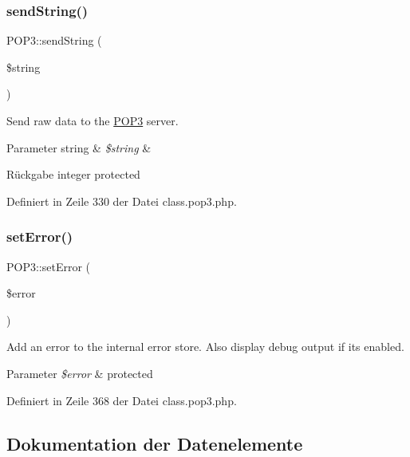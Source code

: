 \subsubsection{\texorpdfstring{send\+String()}{sendString()}}
{\footnotesize\ttfamily P\+O\+P3\+::send\+String (\begin{DoxyParamCaption}\item[{}]{\$string }\end{DoxyParamCaption})\hspace{0.3cm}{\ttfamily [protected]}}

Send raw data to the \mbox{\hyperlink{class_p_o_p3}{P\+O\+P3}} server. 
\begin{DoxyParams}[1]{Parameter}
string & {\em \$string} & \\
\hline
\end{DoxyParams}
\begin{DoxyReturn}{Rückgabe}
integer  protected 
\end{DoxyReturn}


Definiert in Zeile 330 der Datei class.\+pop3.\+php.

\mbox{\label{class_p_o_p3_abf17a9af3cbdf988738dfb894efd0c8a}} 
\subsubsection{\texorpdfstring{set\+Error()}{setError()}}
{\footnotesize\ttfamily P\+O\+P3\+::set\+Error (\begin{DoxyParamCaption}\item[{}]{\$error }\end{DoxyParamCaption})\hspace{0.3cm}{\ttfamily [protected]}}

Add an error to the internal error store. Also display debug output if it\textquotesingle{}s enabled. 
\begin{DoxyParams}{Parameter}
{\em \$error} & protected \\
\hline
\end{DoxyParams}


Definiert in Zeile 368 der Datei class.\+pop3.\+php.



\subsection{Dokumentation der Datenelemente}
\mbox{\label{class_p_o_p3_a5de802c27a18225db6247ced4e3caae9}} 
